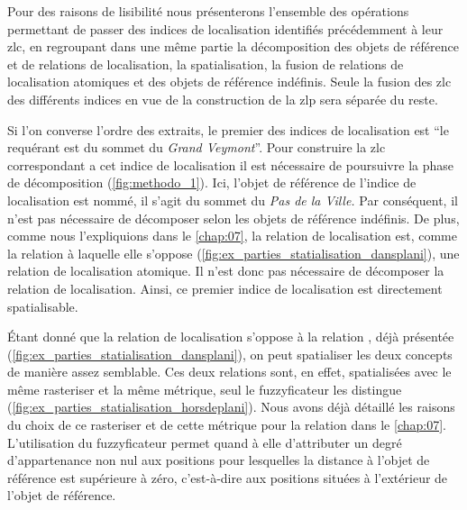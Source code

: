 Pour des raisons de lisibilité nous présenterons l'ensemble des
opérations permettant de passer des indices de localisation identifiés
précédemment à leur \ac{zlc}, en regroupant dans une même partie la
décomposition des objets de référence et de relations de localisation,
la spatialisation, la fusion de relations de localisation atomiques et
des objets de référence indéfinis. Seule la fusion des \ac{zlc} des
différents indices en vue de la construction de la \ac{zlp} sera
séparée du reste.


Si l'on converse l'ordre des extraits, le premier des indices de
localisation est \enquote{le requérant est
   du sommet du \emph{Grand
    Veymont}}. Pour construire la \ac{zlc} correspondant a cet indice
de localisation il est nécessaire de poursuivre la phase de
décomposition (\autoref{fig:methodo_1}). Ici, l'objet de référence de
l'indice de localisation est nommé, il s'agit du sommet du \emph{Pas
  de la Ville.} Par conséquent, il n'est pas nécessaire de décomposer
selon les objets de référence indéfinis. De plus, comme nous
l'expliquions dans le \autoref{chap:07}, la relation de localisation
 est, comme la relation
 à laquelle elle s'oppose
(\autoref{fig:ex_parties_statialisation_dansplani}), une relation de
localisation atomique. Il n'est donc pas nécessaire de décomposer la
relation de localisation. Ainsi, ce premier indice de localisation est
directement spatialisable.

Étant donné que la relation de localisation
 s'oppose à la relation
, déjà présentée
(\autoref{fig:ex_parties_statialisation_dansplani}), on peut
spatialiser les deux concepts de manière assez semblable. Ces deux
relations sont, en effet, spatialisées avec le même rasteriser et la
même métrique, seul le fuzzyficateur les distingue
(\autoref{fig:ex_parties_statialisation_horsdeplani}). Nous avons déjà
détaillé les raisons du choix de ce rasteriser et de cette métrique
pour la relation  dans le
\autoref{chap:07}. L'utilisation du fuzzyficateur 
permet quand à elle d'attributer un degré d'appartenance non nul aux
positions pour lesquelles la distance à l'objet de référence est
supérieure à zéro, c'est-à-dire aux positions situées à l'extérieur de
l'objet de référence.

